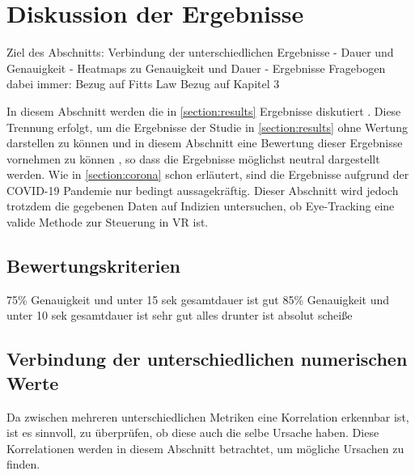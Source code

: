 
\chapter{Diskussion der Ergebnisse}
Ziel des Abschnitts:
	Verbindung der unterschiedlichen Ergebnisse
		- Dauer und Genauigkeit
		- Heatmaps zu Genauigkeit und Dauer
		- Ergebnisse Fragebogen
	dabei immer:	
		Bezug auf Fitts Law
		Bezug auf Kapitel 3

In diesem Abschnitt werden die in \autoref{section:results} Ergebnisse diskutiert . Diese Trennung erfolgt, um die Ergebnisse der Studie in \autoref{section:results} ohne Wertung darstellen zu können und in diesem Abschnitt eine Bewertung dieser Ergebnisse  vornehmen zu können , so dass die Ergebnisse möglichst neutral dargestellt werden. Wie in \autoref{section:corona} schon erläutert, sind die Ergebnisse aufgrund der COVID-19 Pandemie nur bedingt aussagekräftig. Dieser Abschnitt wird jedoch trotzdem die gegebenen Daten auf Indizien untersuchen, ob Eye-Tracking eine valide Methode zur Steuerung in VR ist. 

\section{Bewertungskriterien}
75\% Genauigkeit und unter 15 sek gesamtdauer ist gut
85\% Genauigkeit und unter 10 sek gesamtdauer ist sehr gut
alles drunter ist absolut scheiße 

\section{Verbindung der unterschiedlichen numerischen Werte}
Da zwischen mehreren unterschiedlichen Metriken eine Korrelation erkennbar ist, ist es sinnvoll, zu überprüfen, ob diese auch die selbe Ursache haben. Diese Korrelationen werden in diesem Abschnitt betrachtet, um mögliche Ursachen zu finden.

